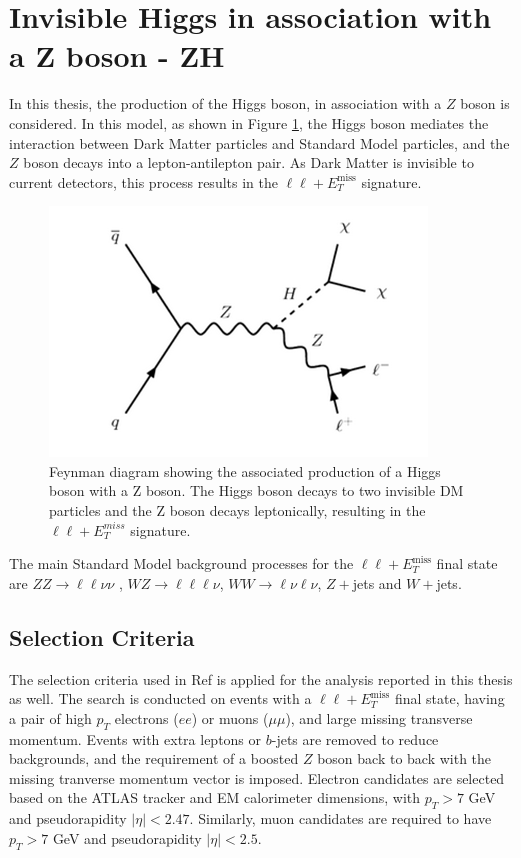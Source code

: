 \documentclass[11pt,a4paper,openright,twoside]{report}
\newcommand{\ZZ}{$ZZ\to \ell\ell\nu\nu$ }
\newcommand{\met}{$E_T^{\mathrm{miss}}$ }
\begin{document}
\section{Invisible Higgs in association with a Z boson - ZH}
In this thesis, the production of the Higgs boson, in association with a $Z$ boson is considered. In this model, as shown in Figure \ref{fig:HZ}, the Higgs boson mediates the interaction between Dark Matter particles and Standard Model particles, and the $Z$ boson decays into a lepton-antilepton pair. As Dark Matter is invisible to current detectors, this process results in the $\ell\ell+$\met signature.
\begin{figure}[H]
\centering
	\includegraphics[width=0.5\linewidth]{HZ.png}
	\caption{Feynman diagram showing the associated production of a Higgs boson with a Z boson. The Higgs boson decays to two invisible DM particles and the Z boson decays leptonically, resulting in the $\ell\ell+ E_T^{miss}$ signature.}
		\label{fig:HZ}
\end{figure}
The main Standard Model background processes for the $\ell\ell+$\met final state are \ZZ, $WZ\to \ell\ell\ell\nu$, $WW\to \ell\nu \ell\nu$, $Z+$jets and $W+$jets. 

\subsection{Selection Criteria}
The selection criteria used in Ref \cite{ZH_ATLAS} is applied for the analysis reported in this thesis as well. The search is conducted on events with a $\ell\ell+$\met final state, having a pair of high $p_T$ electrons ($ee$) or muons ($\mu\mu$), and large missing transverse momentum. Events with extra leptons or $b$-jets are removed to reduce backgrounds, and the requirement of a boosted $Z$ boson back to back with the missing tranverse momentum vector is imposed. Electron candidates are selected based on the ATLAS tracker and EM calorimeter dimensions, with $p_T > 7$ GeV and pseudorapidity $|\eta| < 2.47$. Similarly, muon candidates are required to have $p_T > 7$ GeV and pseudorapidity $|\eta| < 2.5$.
\end{document}
